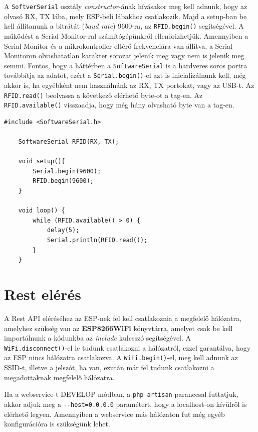 \documentclass[
]{thesis-ekf}
\theoremstyle{definition}
\theoremstyle{remark}
\begin{document}
A \texttt{SoftverSerial} osztály \emph{constructor}-ának hívásakor meg kell adnunk, hogy az olvasó RX, TX lába, mely ESP-beli lábakhoz csatlakozik. Majd a setup-ban be kell állítanunk a bitrátát (\emph{baud rate}) 9600-ra, az \texttt{RFID.begin()} segítségével. A működést a Serial Monitor-ral számítógépünkről ellenőrizhetjük. Amennyiben a Serial Monitor és a mikrokontroller eltérő frekvenciára van állítva, a Serial Monitoron olvashatatlan karakter sorozat jelenik meg vagy nem is jelenik meg semmi. Fontos, hogy a háttérben a \texttt{SoftwareSerial} is a hardveres soros portra továbbítja az adatot, ezért a \texttt{Serial.begin()}-el azt is inicializálnunk kell, még akkor is, ha egyébként nem használnánk az RX, TX portokat, vagy az USB-t.
Az \texttt{RFID.read()} beolvassa a következő elérhető byte-ot a tag-en. Az \texttt{RFID.available()} visszaadja, hogy még hány olvasható byte van a tag-en.

\lstset{style=mystyle}
\begin{lstlisting}[caption={RFID olvasás példa}]
    #include <SoftwareSerial.h>

    SoftwareSerial RFID(RX, TX);

    void setup(){
        Serial.begin(9600);
        RFID.begin(9600);
    }

    void loop() {
        while (RFID.available() > 0) {
            delay(5);
            Serial.println(RFID.read());
        }
    }
\end{lstlisting}

\section{Rest elérés}
A Rest API eléréséhez az ESP-nek fel kell csatlakoznia a megfelelő hálózatra, amelyhez szükség van az \textbf{ESP8266WiFi} könyvtárra, amelyet csak be kell importálnunk a kódunkba az \emph{include} kulcsszó segítségével.
A \texttt{WiFi.disconnect()}-el le tudunk csatlakozni a hálózatról, ezzel garantálva, hogy az ESP nincs hálózatra csatlakozva.
A \texttt{WiFi.begin()}-el, meg kell adnunk az SSID-t, illetve a jelszót, ha van, ezután már fel tudunk csatlakozni a megadottaknak megfelelő hálózatra. \cite{esp8266-wifi}

Ha a webservice-t DEVELOP módban, a \texttt{php artisan} paranccsal futtatjuk, akkor adjuk meg a \texttt{-{}-host=0.0.0.0} paramétert, hogy a localhost-on kívülről is elérhető legyen.
Amennyiben a webservice más hálózaton fut még egyéb konfigurációra is szükségünk lehet.
\end{document}
